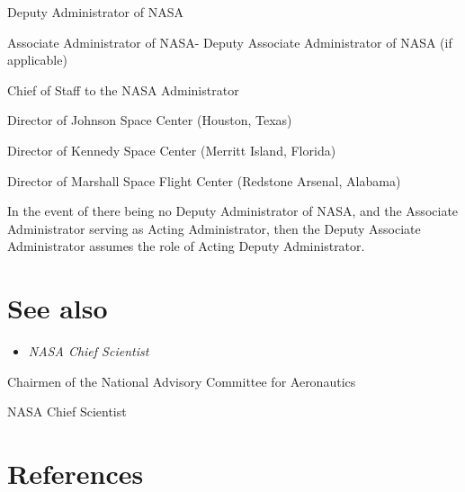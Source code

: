 Deputy Administrator of NASA

Associate Administrator of NASA- Deputy Associate Administrator of NASA
(if applicable)

Chief of Staff to the NASA Administrator

Director of Johnson Space Center (Houston, Texas)

Director of Kennedy Space Center (Merritt Island, Florida)

Director of Marshall Space Flight Center (Redstone Arsenal, Alabama)

In the event of there being no Deputy Administrator of NASA, and the
Associate Administrator serving as Acting Administrator, then the Deputy
Associate Administrator assumes the role of Acting Deputy Administrator.

\section{See also}\label{see-also}

\begin{itemize}
\item
  \emph{NASA Chief Scientist}
\end{itemize}

Chairmen of the National Advisory Committee for Aeronautics

NASA Chief Scientist

\section{References}\label{references}
